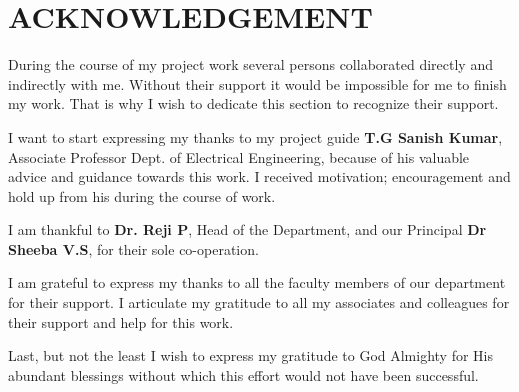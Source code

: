 \documentclass[12pt,a4paper]{report}
\begin{document}
\chapter*{ACKNOWLEDGEMENT\centering}
\par
\hspace{0.9cm}During the course of my project work several persons collaborated directly and indirectly with me. Without their support it would be impossible for me to finish my work. That is why I wish to dedicate this section to recognize their support.
\vspace {.2cm}
\par
\hspace{.35cm}I want to start expressing my thanks to my project guide {\bf T.G Sanish Kumar}, Associate Professor Dept. of Electrical Engineering, because of his valuable advice and guidance towards this work. I received motivation; encouragement and hold up from his during the course of work.
\vspace{.2cm}
\par 
\hspace{.35cm}I am thankful to {\bf Dr. Reji P}, 
Head of the Department, and our Principal {\bf Dr Sheeba V.S}, for their sole co-operation.
\vspace{0.2cm}
\par
\hspace{0.35cm}I am grateful to express my thanks to all the faculty members of our department for their support. I articulate my gratitude to all my associates and colleagues for their support and help for this work.
\vspace{0.2cm}
\par
\hspace{0.35cm}Last, but not the least I wish to express my gratitude to God Almighty for His abundant blessings without which this effort would not have been successful.\\
\thispagestyle{empty}
\clearpage

\end{document}
